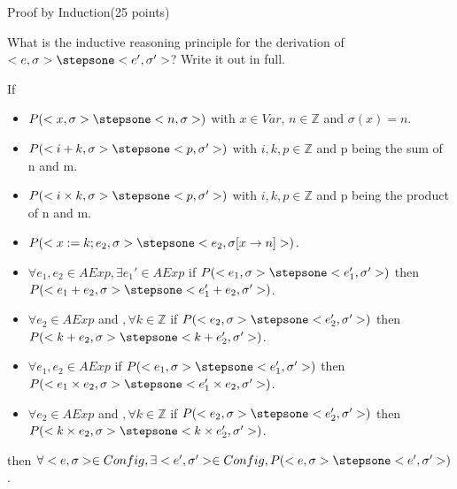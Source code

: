 \documentclass{article}
\begin{document}
%
%
%

\newpage
\begin{question}{Proof by Induction}{(25 points)}


  
  \begin{subquestion}
  	 What is the inductive reasoning principle for the derivation of $<e, \sigma> \stepsone <e', \sigma'>$? Write it out in full.
  	 
  	 If
  	 \begin{itemize}
  	 \item $P(<x, \sigma> \stepsone <n, \sigma>)$ with $x \in Var$, $n \in \mathbb{Z}$ and $\sigma(x) = n$.
   	 \item $P(<i+k, \sigma> \stepsone <p, \sigma'>)$ with $i,k,p \in \mathbb{Z}$ and p being the sum of n and m.
   	 \item $P(<i \times k, \sigma> \stepsone <p, \sigma'>)$ with $i,k,p \in \mathbb{Z}$ and p being the product of n and m.
   	 \item $P(<x := k; e_2, \sigma> \stepsone <e_2, \sigma[x \rightarrow n]>)$.
   	 \item $\forall e_1, e_2 \in AExp, \exists e_1' \in AExp$ if $P(<e_1, \sigma> \stepsone <e_1', \sigma'>)$ then $P(<e_1+e_2, \sigma> \stepsone <e_1'+e_2, \sigma'>)$.
   	 \item $\forall e_2 \in AExp$ and $, \forall k \in \mathbb{Z}$ if $P(<e_2, \sigma> \stepsone <e_2', \sigma'>)$ then $P(<k+e_2, \sigma> \stepsone <k+e_2', \sigma'>)$.
   	 \item $\forall e_1, e_2 \in AExp$ if $P(<e_1, \sigma> \stepsone <e_1', \sigma'>)$ then $P(<e_1 \times e_2, \sigma> \stepsone <e_1' \times e_2, \sigma'>)$.
   	 \item $\forall e_2 \in AExp$ and $, \forall k \in \mathbb{Z}$ if $P(<e_2, \sigma> \stepsone <e_2', \sigma'>)$ then $P(<k \times e_2, \sigma> \stepsone <k \times e_2', \sigma'>)$.
  	 \end{itemize}
   	 then $\forall <e, \sigma> \in Config, \exists <e', \sigma'> \in Config, P(<e, \sigma> \stepsone <e', \sigma'>)$.
  	 

\end{subquestion}
\end{question}
\end{document}
